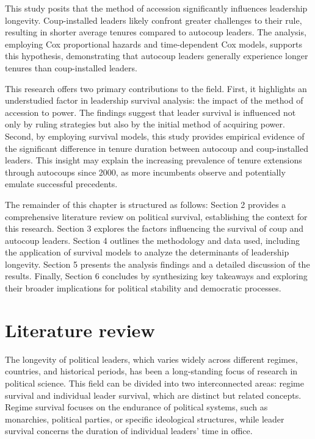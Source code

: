 \documentclass[
  12pt,
]{report}
\begin{document}
This study posits that the method of accession significantly influences
leadership longevity. Coup-installed leaders likely confront greater
challenges to their rule, resulting in shorter average tenures compared
to autocoup leaders. The analysis, employing Cox proportional hazards
and time-dependent Cox models, supports this hypothesis, demonstrating
that autocoup leaders generally experience longer tenures than
coup-installed leaders.

This research offers two primary contributions to the field. First, it
highlights an understudied factor in leadership survival analysis: the
impact of the method of accession to power. The findings suggest that
leader survival is influenced not only by ruling strategies but also by
the initial method of acquiring power. Second, by employing survival
models, this study provides empirical evidence of the significant
difference in tenure duration between autocoup and coup-installed
leaders. This insight may explain the increasing prevalence of tenure
extensions through autocoups since 2000, as more incumbents observe and
potentially emulate successful precedents.

The remainder of this chapter is structured as follows: Section 2
provides a comprehensive literature review on political survival,
establishing the context for this research. Section 3 explores the
factors influencing the survival of coup and autocoup leaders. Section 4
outlines the methodology and data used, including the application of
survival models to analyze the determinants of leadership longevity.
Section 5 presents the analysis findings and a detailed discussion of
the results. Finally, Section 6 concludes by synthesizing key takeaways
and exploring their broader implications for political stability and
democratic processes.

\section{Literature review}\label{literature-review}

The longevity of political leaders, which varies widely across different
regimes, countries, and historical periods, has been a long-standing
focus of research in political science. This field can be divided into
two interconnected areas: regime survival and individual leader
survival, which are distinct but related concepts. Regime survival
focuses on the endurance of political systems, such as monarchies,
political parties, or specific ideological structures, while leader
survival concerns the duration of individual leaders' time in office.
\end{document}

